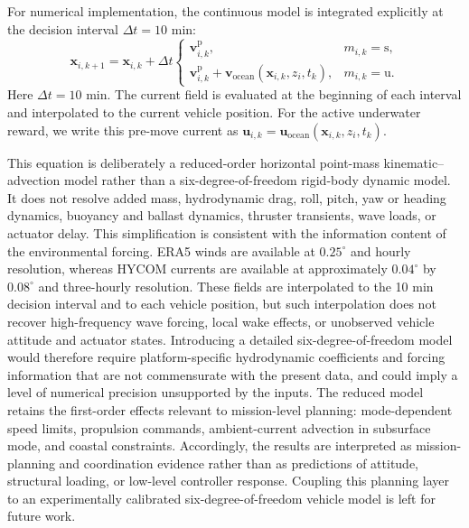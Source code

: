 \documentclass[a4paper,fleqn]{cas-dc}
\begin{document}
For numerical implementation, the continuous model is integrated explicitly at
the decision interval $\Delta t=10$ min:
\begin{equation}
\mathbf{x}_{i,k+1}=
\mathbf{x}_{i,k}+
\Delta t
\begin{cases}
\mathbf{v}_{i,k}^{\mathrm{p}},
& m_{i,k}=\mathrm{s},\\[1mm]
\mathbf{v}_{i,k}^{\mathrm{p}}+
\mathbf{v}_{\mathrm{ocean}}(\mathbf{x}_{i,k},z_i,t_k),
& m_{i,k}=\mathrm{u}.
\end{cases}
\label{eq:platform_motion_discrete}
\end{equation}
Here \(\Delta t=10\) min. The current field is evaluated at the beginning of
each interval and interpolated to the current vehicle position.
For the active underwater reward, we write this pre-move current as
$\mathbf{u}_{i,k}=\mathbf{u}_{\mathrm{ocean}}
(\mathbf{x}_{i,k},z_i,t_k)$.

This equation is deliberately a reduced-order horizontal point-mass
kinematic--advection model rather than a six-degree-of-freedom rigid-body
dynamic model. It does not resolve added mass, hydrodynamic drag, roll, pitch,
yaw or heading dynamics, buoyancy and ballast dynamics, thruster transients,
wave loads, or actuator delay. This simplification is consistent with the
information content of the environmental forcing. ERA5 winds are available at
$0.25^\circ$ and hourly resolution, whereas HYCOM currents are available at
approximately $0.04^\circ$ by $0.08^\circ$ and three-hourly resolution. These
fields are interpolated to the 10 min decision interval and to each vehicle
position, but such interpolation does not recover high-frequency wave forcing,
local wake effects, or unobserved vehicle attitude and actuator states.
Introducing a detailed six-degree-of-freedom model would therefore require
platform-specific hydrodynamic coefficients and forcing information that are
not commensurate with the present data, and could imply a level of numerical
precision unsupported by the inputs. The reduced model retains the first-order
effects relevant to mission-level planning: mode-dependent speed limits,
propulsion commands, ambient-current advection in subsurface mode, and coastal
constraints. Accordingly, the results are interpreted as mission-planning and
coordination evidence rather than as predictions of attitude, structural
loading, or low-level controller response. Coupling this planning layer to an
experimentally calibrated six-degree-of-freedom vehicle model is left for future work.
\end{document}
